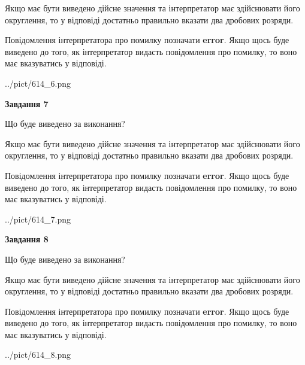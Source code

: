 \documentclass[12pt, ukrainian]{article}
\begin{document}
{\begin {Large}
Якщо має бути виведено дійсне значення та інтерпретатор має здійснювати його округлення, 
то у відповіді достатньо правильно вказати два дробових розряди.

Повідомлення інтерпретатора про помилку позначати \textbf{error}.
Якщо щось буде виведено до того, як інтерпретатор видасть повідомлення про помилку, 
то воно має вказуватись у відповіді. \par

\begin{center}
	{../pict/614_6.png}
\end{center}
\newpage

{\begin {center}\textbf{Завдання 7}\end {center}}\par
Що буде виведено за виконання? \par

Якщо має бути виведено дійсне значення та інтерпретатор має здійснювати його округлення, 
то у відповіді достатньо правильно вказати два дробових розряди.

Повідомлення інтерпретатора про помилку позначати \textbf{error}.
Якщо щось буде виведено до того, як інтерпретатор видасть повідомлення про помилку, 
то воно має вказуватись у відповіді. \par

\begin{center}
	{../pict/614_7.png}
\end{center}
\newpage

{\begin {center}\textbf{Завдання 8}\end {center}}\par
Що буде виведено за виконання? \par

Якщо має бути виведено дійсне значення та інтерпретатор має здійснювати його округлення, 
то у відповіді достатньо правильно вказати два дробових розряди.

Повідомлення інтерпретатора про помилку позначати \textbf{error}.
Якщо щось буде виведено до того, як інтерпретатор видасть повідомлення про помилку, 
то воно має вказуватись у відповіді. \par

\begin{center}
	{../pict/614_8.png}
\end{center}
\newpage


\end{Large}}
\end{document}
